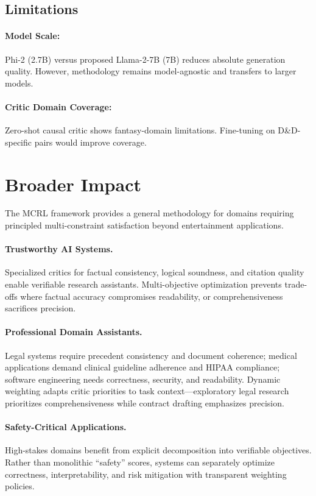 \documentclass[11pt]{article}
\begin{document}
\subsection{Limitations}

\paragraph{Model Scale:} Phi-2 (2.7B) versus proposed Llama-2-7B (7B) reduces absolute generation quality. However, methodology remains model-agnostic and transfers to larger models.

\paragraph{Critic Domain Coverage:} Zero-shot causal critic shows fantasy-domain limitations. Fine-tuning on D\&D-specific pairs would improve coverage.


\section{Broader Impact}

The MCRL framework provides a general methodology for domains requiring principled multi-constraint satisfaction beyond entertainment applications.

\paragraph{Trustworthy AI Systems.} Specialized critics for factual consistency, logical soundness, and citation quality enable verifiable research assistants. Multi-objective optimization prevents trade-offs where factual accuracy compromises readability, or comprehensiveness sacrifices precision.

\paragraph{Professional Domain Assistants.} Legal systems require precedent consistency and document coherence; medical applications demand clinical guideline adherence and HIPAA compliance; software engineering needs correctness, security, and readability. Dynamic weighting adapts critic priorities to task context—exploratory legal research prioritizes comprehensiveness while contract drafting emphasizes precision.

\paragraph{Safety-Critical Applications.} High-stakes domains benefit from explicit decomposition into verifiable objectives. Rather than monolithic ``safety'' scores, systems can separately optimize correctness, interpretability, and risk mitigation with transparent weighting policies.
\end{document}
